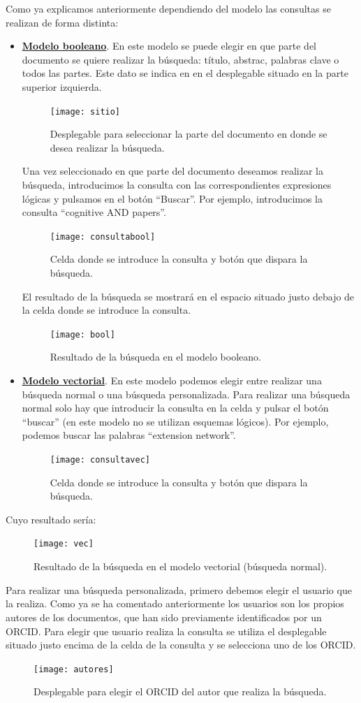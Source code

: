 \documentclass[size=a4, parskip=half, titlepage=false, toc=flat, toc=bib, 12pt]{scrartcl}
\theoremstyle{theorem-style}
\theoremstyle{definition-style}
\theoremstyle{remark-style}
\theoremstyle{example-style}
\theoremstyle{definition-style}
\theoremstyle{remark-style}
\begin{document}
Como ya explicamos anteriormente dependiendo del modelo las consultas se realizan de forma distinta:
\begin{itemize}
\item \textbf{\underline{Modelo booleano}}. En este modelo se puede elegir en que parte del documento se quiere realizar la búsqueda: título, abstrac, palabras clave o todos las partes. Este dato se indica en en el desplegable situado en la parte superior izquierda.

\begin{figure}[H]
\centering
\texttt{[image: sitio]}
\caption{Desplegable para seleccionar la parte del documento en donde se desea realizar la búsqueda.}
\end{figure}

Una vez seleccionado en que parte del documento deseamos realizar la búsqueda, introducimos la consulta con las correspondientes expresiones lógicas y pulsamos en el botón ``Buscar''. Por ejemplo, introducimos la consulta ``cognitive AND papers''.

\begin{figure}[H]
\centering
\texttt{[image: consultabool]}
\caption{Celda donde se introduce la consulta y botón que dispara la búsqueda.}
\end{figure}
El resultado de la búsqueda se mostrará en el espacio situado justo debajo de la celda donde se introduce la consulta.

\begin{figure}[H]
\centering
\texttt{[image: bool]}
\caption{Resultado de la búsqueda en el modelo booleano.}
\end{figure}

\item \textbf{\underline{Modelo vectorial}}. En este modelo podemos elegir entre realizar una búsqueda normal o una búsqueda personalizada. Para realizar una búsqueda normal solo hay que introducir la consulta en la celda y pulsar el botón ``buscar'' (en este modelo no se utilizan esquemas lógicos). Por ejemplo, podemos buscar las palabras ``extension network''.
\begin{figure}[H]
\centering
\texttt{[image: consultavec]}
\caption{Celda donde se introduce la consulta y botón que dispara la búsqueda.}
\end{figure}
\end{itemize}
Cuyo resultado sería:
\begin{figure}[H]
\centering
\texttt{[image: vec]}
\caption{Resultado de la búsqueda en el modelo vectorial (búsqueda normal).}
\end{figure}
Para realizar una búsqueda personalizada, primero debemos elegir el usuario que la realiza. Como ya se ha comentado anteriormente los usuarios son los propios autores de los documentos, que han sido previamente identificados por un ORCID. Para elegir que usuario realiza la consulta se utiliza el desplegable situado justo encima de la celda de la consulta y se selecciona uno de los ORCID.
\begin{figure}[H]
\centering
\texttt{[image: autores]}
\caption{Desplegable para elegir el ORCID del autor que realiza la búsqueda.}
\end{figure}
\end{document}
